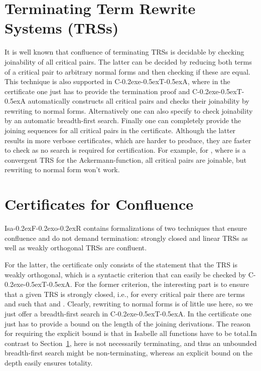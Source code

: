 \documentclass[a4paper]{easychair}
\newcommand\isafor{\textsf{Isa\kern-0.2exF\kern-0.2exo\kern-0.2exR}\xspace}
\newcommand\ceta{\textsf{C\kern-0.2exe\kern-0.5exT\kern-0.5exA}\xspace}
\newcommand\rSC[1]{Section~\ref{sect:#1}}
\begin{document}
\section{Terminating Term Rewrite Systems (TRSs)}
\label{sect:terminating}
It is well known that confluence of terminating TRSs is decidable by checking
joinability of all critical pairs. The latter can be decided by reducing both terms of
a critical pair to arbitrary normal forms and then checking if these are equal.
This technique is also supported in \ceta, where in the certificate one just has to 
provide the termination
proof and \ceta automatically constructs all critical pairs and checks their joinability by
rewriting to normal forms. 
Alternatively one can also specify to check joinability by an automatic breadth-first search. 
Finally one can completely provide the joining sequences for all critical pairs in the certificate. 
Although the latter results in more verbose certificates, which are harder to produce,
they are faster to check as no search is required for certification.
For example, for  , where 
  is a convergent TRS for the Ackermann-function, all critical pairs are joinable, 
  but rewriting to normal form won't work.
  


\section{Certificates for Confluence}
\isafor contains formalizations of two techniques
that ensure confluence and do not demand termination: strongly closed and linear TRSs as well as weakly orthogonal TRSs 
are confluent.

For the latter, the certificate only consists of the statement that the TRS is weakly
orthogonal, which is a syntactic criterion that can easily be checked by \ceta. 
For the former criterion, the interesting part is to ensure that a given TRS  is strongly closed,
i.e., for every critical pair  there are terms  and  such that 
 and . Clearly,
rewriting to normal forms is of little use here, so we just offer a breadth-first search
in \ceta. In the certificate one just has to provide a bound on the length of the joining
derivations. The reason for requiring the explicit bound is that
in Isabelle all functions have to be total.\pagebreak In contrast to \rSC{terminating},
here  is not necessarily terminating,
and thus an unbounded breadth-first search might be non-terminating, whereas an explicit bound on the
depth easily ensures totality.
\end{document}
